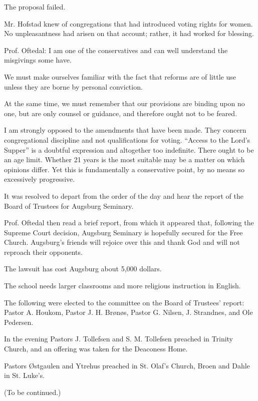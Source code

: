 The proposal failed.

Mr. Hofstad knew of congregations that had introduced voting rights for women. No unpleasantness had arisen on that account; rather, it had worked for blessing.

Prof. Oftedal: I am one of the conservatives and can well understand the misgivings some have.

We must make ourselves familiar with the fact that reforms are of little use unless they are borne by personal conviction.

At the same time, we must remember that our provisions are binding upon no one, but are only counsel or guidance, and therefore ought not to be feared.

I am strongly opposed to the amendments that have been made. They concern congregational discipline and not qualifications for voting. “Access to the Lord’s Supper” is a doubtful expression and altogether too indefinite. There ought to be an age limit. Whether 21 years is the most suitable may be a matter on which opinions differ. Yet this is fundamentally a conservative point, by no means so excessively progressive.

It was resolved to depart from the order of the day and hear the report of the Board of Trustees for Augsburg Seminary.

Prof. Oftedal then read a brief report, from which it appeared that, following the Supreme Court decision, Augsburg Seminary is hopefully secured for the Free Church. Augsburg’s friends will rejoice over this and thank God and will not reproach their opponents.

The lawsuit has cost Augsburg about 5,000 dollars.

The school needs larger classrooms and more religious instruction in English.

The following were elected to the committee on the Board of Trustees’ report: Pastor A. Houkom, Pastor J. H. Brønøs, Pastor G. Nilsen, J. Strandnes, and Ole Pedersen.

In the evening Pastors J. Tollefsen and S. M. Tollefsen preached in Trinity Church, and an offering was taken for the Deaconess Home.

Pastors Østgaulen and Ytrehus preached in St. Olaf’s Church, Broen and Dahle in St. Luke’s.

(To be continued.) 

